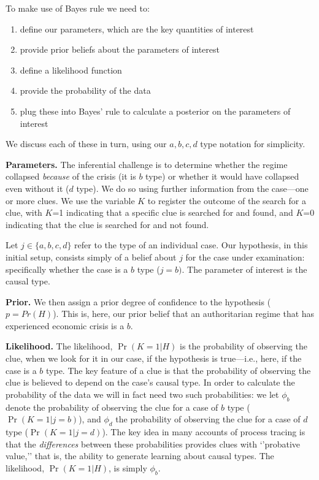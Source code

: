 \documentclass[
  12pt,
]{book}
\providecommand{\tightlist}{%
  \setlength{\itemsep}{0pt}\setlength{\parskip}{0pt}}
\begin{document}
To make use of Bayes rule we need to:

\begin{enumerate}
\def\labelenumi{\arabic{enumi}.}
\tightlist
\item
  define our parameters, which are the key quantities of interest
\item
  provide prior beliefs about the parameters of interest
\item
  define a likelihood function
\item
  provide the probability of the data
\item
  plug these into Bayes' rule to calculate a posterior on the parameters of interest
\end{enumerate}

We discuss each of these in turn, using our \(a, b, c, d\) type notation for simplicity.

\textbf{Parameters.} The inferential challenge is to determine whether the regime collapsed \emph{because} of the crisis (it is \(b\) type) or whether it would have collapsed even without it (\(d\) type). We do so using further information from the case---one or more clues. We use the variable \(K\) to register the outcome of the search for a clue, with \(K\)=1 indicating that a specific clue is searched for and found, and \(K\)=0 indicating that the clue is searched for and not found.

Let \(j\in \{a,b,c,d\}\) refer to the type of an individual case. Our hypothesis, in this initial setup, consists simply of a belief about \(j\) for the case under examination: specifically whether the case is a \(b\) type (\(j=b)\). The parameter of interest is the causal type.

\textbf{Prior.} We then assign a prior degree of confidence to the hypothesis (\(p = Pr(H)\)). This is, here, our prior belief that an authoritarian regime that has experienced economic crisis is a \(b\).

\textbf{Likelihood.} The likelihood, \(\Pr(K=1|H)\) is the probability of observing the clue, when we look for it in our case, if the hypothesis is true---i.e., here, if the case is a \(b\) type. The key feature of a clue is that the probability of observing the clue is believed to depend on the case's causal type. In order to calculate the probability of the data we will in fact need two such probabilities: we let \(\phi_b\) denote the probability of observing the clue for a case of \(b\) type (\(\Pr(K=1|j=b)\)), and \(\phi_d\) the probability of observing the clue for a case of \(d\) type (\(\Pr(K=1|j=d)\)). The key idea in many accounts of process tracing is that the \emph{differences} between these probabilities provides clues with `'probative value,'' that is, the ability to generate learning about causal types. The likelihood, \(\Pr(K=1|H)\), is simply \(\phi_b\).
\end{document}

